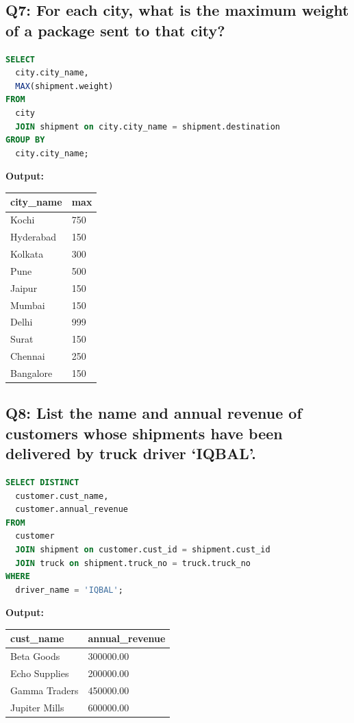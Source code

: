\documentclass[11pt, a4paper]{article}
\begin{document}
\subsection*{Q7: For each city, what is the maximum weight of a package sent to that city?}
\begin{lstlisting}[language=SQL]
SELECT
  city.city_name,
  MAX(shipment.weight)
FROM
  city
  JOIN shipment on city.city_name = shipment.destination
GROUP BY
  city.city_name;
\end{lstlisting}
\vspace{0.3cm}
\textbf{Output:}\vspace{0.2cm}
\begin{center}
\begin{tabular}{|l|l|}
\hline
\textbf{city\_name} & \textbf{max} \\ \hline
Kochi & 750 \\ \hline
Hyderabad & 150 \\ \hline
Kolkata & 300 \\ \hline
Pune & 500 \\ \hline
Jaipur & 150 \\ \hline
Mumbai & 150 \\ \hline
Delhi & 999 \\ \hline
Surat & 150 \\ \hline
Chennai & 250 \\ \hline
Bangalore & 150 \\ \hline
\end{tabular}
\end{center}
\newpage
\subsection*{Q8: List the name and annual revenue of customers whose shipments have been delivered by truck driver ‘IQBAL’.}
\begin{lstlisting}[language=SQL]
SELECT DISTINCT
  customer.cust_name,
  customer.annual_revenue
FROM
  customer
  JOIN shipment on customer.cust_id = shipment.cust_id
  JOIN truck on shipment.truck_no = truck.truck_no
WHERE
  driver_name = 'IQBAL';
\end{lstlisting}
\vspace{0.3cm}
\textbf{Output:}\vspace{0.2cm}
\begin{center}
\begin{tabular}{|l|l|}
\hline
\textbf{cust\_name} & \textbf{annual\_revenue} \\ \hline
Beta Goods & 300000.00 \\ \hline
Echo Supplies & 200000.00 \\ \hline
Gamma Traders & 450000.00 \\ \hline
Jupiter Mills & 600000.00 \\ \hline
\end{tabular}
\end{center}
\newpage
\end{document}
